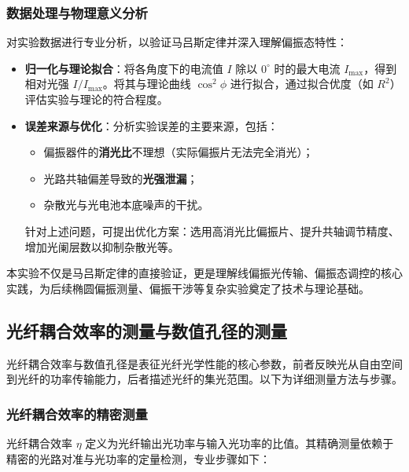 \documentclass[11pt]{article}
\begin{document}
\subsubsection{数据处理与物理意义分析}
对实验数据进行专业分析，以验证马吕斯定律并深入理解偏振态特性：

\begin{itemize}
  \item \textbf{归一化与理论拟合}：将各角度下的电流值 $I$ 除以 $0^\circ$ 时的最大电流 $I_{\text{max}}$，得到相对光强 $I/I_{\text{max}}$。将其与理论曲线 $\cos^2\phi$ 进行拟合，通过拟合优度（如 $R^2$）评估实验与理论的符合程度。
  
  \item \textbf{误差来源与优化}：分析实验误差的主要来源，包括：
  \begin{itemize}
    \item 偏振器件的\textbf{消光比}不理想（实际偏振片无法完全消光）；
    \item 光路共轴偏差导致的\textbf{光强泄漏}；
    \item 杂散光与光电池本底噪声的干扰。
  \end{itemize}
  
  针对上述问题，可提出优化方案：选用高消光比偏振片、提升共轴调节精度、增加光阑层数以抑制杂散光等。
\end{itemize}

本实验不仅是马吕斯定律的直接验证，更是理解线偏振光传输、偏振态调控的核心实践，为后续椭圆偏振测量、偏振干涉等复杂实验奠定了技术与理论基础。

\subsection{光纤耦合效率的测量与数值孔径的测量}

光纤耦合效率与数值孔径是表征光纤光学性能的核心参数，前者反映光从自由空间到光纤的功率传输能力，后者描述光纤的集光范围。以下为详细测量方法与步骤。

\subsubsection{光纤耦合效率的精密测量}
光纤耦合效率 \(\eta\) 定义为光纤输出光功率与输入光功率的比值。其精确测量依赖于精密的光路对准与光功率的定量检测，专业步骤如下：
\end{document}
